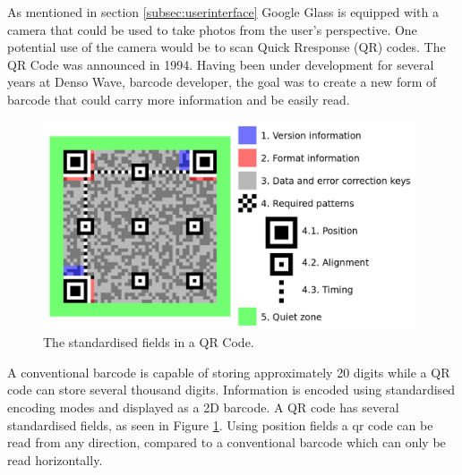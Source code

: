 As mentioned in section \ref{subsec:userinterface} Google Glass is equipped with a camera that could be used to take photos from the user's perspective. One potential use of the camera would be to scan Quick Rresponse (QR) codes. The QR Code was announced in 1994. Having been under development for several years at Denso Wave, barcode developer, the goal was to create a new form of barcode that could carry more information and be easily read.\cite{qrCodeHistory}

	\begin{figure}[ht!]
		\centering
		\includegraphics[width=110mm]{images/qrcodestandard}
		\caption{The standardised fields in a QR Code.\cite{qrCodeWiki}}
		\label{qrcodestandard}
	\end{figure}

A conventional barcode is capable of storing approximately 20 digits while a QR code can store several thousand digits.\cite{qrCodeType} Information is encoded using standardised encoding modes and displayed as a 2D barcode. A QR code has several standardised fields, as seen in Figure \ref{qrcodestandard}. Using position fields a qr code can be read from any direction, compared to a conventional barcode which can only be read horizontally.\cite{qrCodeAbout}